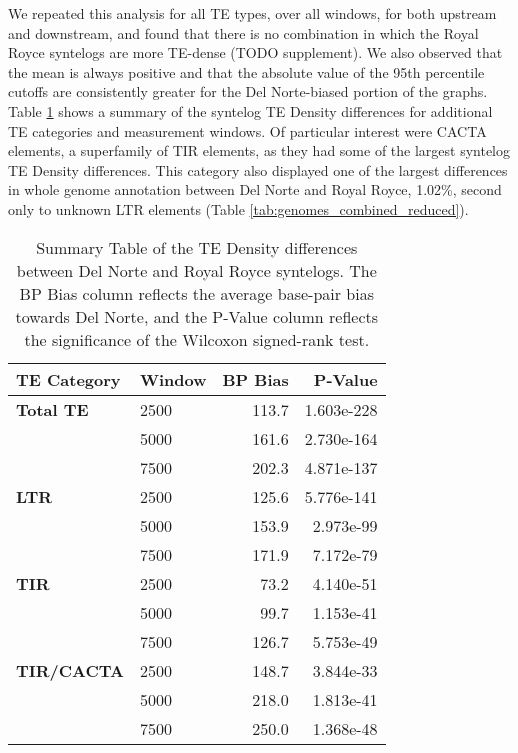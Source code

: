 \documentclass[fleqn,10pt]{olplainarticle}
\begin{document}
We repeated this analysis for all TE types, over all windows, for both upstream and downstream, and found that there is no combination in which the Royal Royce syntelogs are more TE-dense (TODO supplement).
We also observed that the mean is always positive and that the absolute value of the 95th percentile cutoffs are consistently greater for the Del Norte-biased portion of the graphs.
Table \ref{tab:syntelog_summary} shows a summary of the syntelog TE Density differences for additional TE categories and measurement windows.
Of particular interest were CACTA elements, a superfamily of TIR elements, as they had some of the largest syntelog TE Density differences.
This category also displayed one of the largest differences in whole genome annotation between Del Norte and Royal Royce, 1.02\%, second only to unknown LTR elements (Table \ref{tab:genomes_combined_reduced}).

\begin{table}[ht]
\centering
\begin{tabularx}{\textwidth}{l|X|r|r}
\toprule
\textbf{TE Category} & \textbf{Window} & \textbf{BP Bias} & \textbf{P-Value} \\
\toprule
\textbf{Total TE} & 2500 & 113.7 & 1.603e-228 \\
& 5000 & 161.6 & 2.730e-164 \\
& 7500 & 202.3 & 4.871e-137 \\
\hline
\textbf{LTR} & 2500 & 125.6 & 5.776e-141 \\
& 5000 & 153.9 & 2.973e-99 \\
& 7500 & 171.9 & 7.172e-79 \\
\hline
\textbf{TIR} & 2500 & 73.2 & 4.140e-51 \\
& 5000 & 99.7 & 1.153e-41 \\
& 7500 & 126.7 & 5.753e-49 \\
\textbf{TIR/CACTA} & 2500 & 148.7 & 3.844e-33 \\
& 5000 & 218.0 & 1.813e-41 \\
& 7500 & 250.0 & 1.368e-48 \\
\bottomrule
\end{tabularx}
\caption{Summary Table of the TE Density differences between Del Norte and Royal Royce syntelogs. The BP Bias column reflects the average base-pair bias towards Del Norte, and the P-Value column reflects the significance of the Wilcoxon signed-rank test.}
\label{tab:syntelog_summary}
\end{table}
\end{document}
